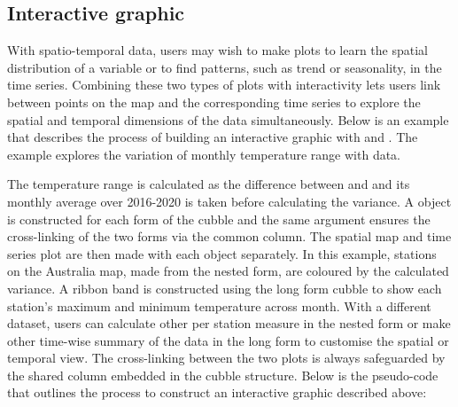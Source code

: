 \documentclass[
]{jss}
\begin{document}
\hypertarget{interactive-graphic}{%
\subsection{Interactive graphic}\label{interactive-graphic}}

With spatio-temporal data, users may wish to make plots to learn the spatial distribution of a variable or to find patterns, such as trend or seasonality, in the time series. Combining these two types of plots with interactivity lets users link between points on the map and the corresponding time series to explore the spatial and temporal dimensions of the data simultaneously. Below is an example that describes the process of building an interactive graphic with  and . The example explores the variation of monthly temperature range with  data.

The temperature range is calculated as the difference between  and  and its monthly average over 2016-2020 is taken before calculating the variance. A  object is constructed for each form of the cubble and the same  argument ensures the cross-linking of the two forms via the common  column. The spatial map and time series plot are then made with each  object separately. In this example, stations on the Australia map, made from the nested form, are coloured by the calculated variance. A ribbon band is constructed using the long form cubble to show each station's maximum and minimum temperature across month. With a different dataset, users can calculate other per station measure in the nested form or make other time-wise summary of the data in the long form to customise the spatial or temporal view. The cross-linking between the two plots is always safeguarded by the shared  column embedded in the cubble structure. Below is the pseudo-code that outlines the process to construct an interactive graphic described above:
\end{document}
